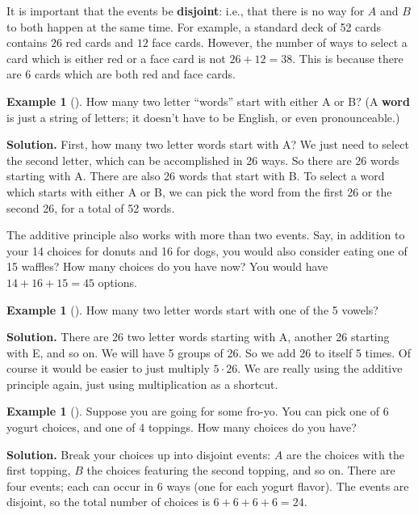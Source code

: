 \documentclass[12pt,]{book}
\newcommand{\terminology}[1]{\textbf{#1}}
\theoremstyle{plain}
\theoremstyle{definition}
\theoremstyle{definition}
\newtheorem{example}[theorem]{Example}
\theoremstyle{definition}
\numberwithin{equation}{chapter}
\begin{document}
\hypertarget{p-706}{}%
It is important that the events be \terminology{disjoint}: i.e., that there is no way for \(A\) and \(B\) to both happen at the same time. For example, a standard deck of 52 cards contains \(26\) red cards and \(12\) face cards. However, the number of ways to select a card which is either red or a face card is not \(26 + 12 = 38\). This is because there are 6 cards which are both red and face cards.%
\begin{example}[]\label{example-34}
\hypertarget{p-707}{}%
How many two letter ``words'' start with either A or B? (A \terminology{word} is just a string of letters; it doesn't have to be English, or even pronounceable.)%
\par\smallskip%
\noindent\textbf{Solution.}\hypertarget{solution-81}{}\quad%
\hypertarget{p-708}{}%
First, how many two letter words start with A? We just need to select the second letter, which can be accomplished in 26 ways. So there are 26 words starting with A. There are also 26 words that start with B. To select a word which starts with either A or B, we can pick the word from the first 26 or the second 26, for a total of 52 words.%
\end{example}
\hypertarget{p-709}{}%
The additive principle also works with more than two events. Say, in addition to your 14 choices for donuts and 16 for dogs, you would also consider eating one of 15 waffles? How many choices do you have now? You would have \(14 + 16 + 15 = 45\) options.%
\begin{example}[]\label{example-35}
\hypertarget{p-710}{}%
How many two letter words start with one of the 5 vowels?%
\par\smallskip%
\noindent\textbf{Solution.}\hypertarget{solution-82}{}\quad%
\hypertarget{p-711}{}%
There are 26 two letter words starting with A, another 26 starting with E, and so on. We will have 5 groups of 26. So we add 26 to itself 5 times. Of course it would be easier to just multiply \(5\cdot 26\). We are really using the additive principle again, just using multiplication as a shortcut.%
\end{example}
\begin{example}[]\label{example-36}
\hypertarget{p-712}{}%
Suppose you are going for some fro-yo. You can pick one of 6 yogurt choices, and one of 4 toppings. How many choices do you have?%
\par\smallskip%
\noindent\textbf{Solution.}\hypertarget{solution-83}{}\quad%
\hypertarget{p-713}{}%
Break your choices up into disjoint events: \(A\) are the choices with the first topping, \(B\) the choices featuring the second topping, and so on. There are four events; each can occur in 6 ways (one for each yogurt flavor). The events are disjoint, so the total number of choices is \(6 + 6 + 6 + 6 = 24\).%
\end{example}
\end{document}
